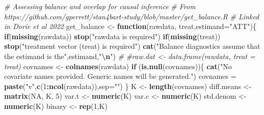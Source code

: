 \documentclass[
  12pt,
]{article}
\newenvironment{Shaded}{\begin{snugshade}}{\end{snugshade}}
\newcommand{\AttributeTok}[1]{\textcolor[rgb]{0.13,0.29,0.53}{#1}}
\newcommand{\CommentTok}[1]{\textcolor[rgb]{0.56,0.35,0.01}{\textit{#1}}}
\newcommand{\ConstantTok}[1]{\textcolor[rgb]{0.56,0.35,0.01}{#1}}
\newcommand{\ControlFlowTok}[1]{\textcolor[rgb]{0.13,0.29,0.53}{\textbf{#1}}}
\newcommand{\DecValTok}[1]{\textcolor[rgb]{0.00,0.00,0.81}{#1}}
\newcommand{\FunctionTok}[1]{\textcolor[rgb]{0.13,0.29,0.53}{\textbf{#1}}}
\newcommand{\NormalTok}[1]{#1}
\newcommand{\OtherTok}[1]{\textcolor[rgb]{0.56,0.35,0.01}{#1}}
\newcommand{\SpecialCharTok}[1]{\textcolor[rgb]{0.81,0.36,0.00}{\textbf{#1}}}
\newcommand{\StringTok}[1]{\textcolor[rgb]{0.31,0.60,0.02}{#1}}
\begin{document}
\begin{Shaded}
\begin{Highlighting}[]
\CommentTok{\# Assessing balance and overlap for causal inference}
\CommentTok{\# From https://github.com/gperrett/stan4bart{-}study/blob/master/get\_balance.R}
\CommentTok{\# Linked in Dorie et al 2022}
\NormalTok{get\_balance }\OtherTok{\textless{}{-}} \ControlFlowTok{function}\NormalTok{(rawdata, treat,}\AttributeTok{estimand=}\StringTok{"ATT"}\NormalTok{)\{}
  \ControlFlowTok{if}\NormalTok{(}\FunctionTok{missing}\NormalTok{(rawdata)) }\FunctionTok{stop}\NormalTok{(}\StringTok{"rawdata is required"}\NormalTok{)}
  \ControlFlowTok{if}\NormalTok{(}\FunctionTok{missing}\NormalTok{(treat)) }\FunctionTok{stop}\NormalTok{(}\StringTok{"treatment vector (treat) is required"}\NormalTok{)}
  \FunctionTok{cat}\NormalTok{(}\StringTok{"Balance diagnostics assume that the estimand is the"}\NormalTok{,estimand,}\StringTok{"}\SpecialCharTok{\textbackslash{}n}\StringTok{"}\NormalTok{)}
  \CommentTok{\#}
  \CommentTok{\#raw.dat \textless{}{-} data.frame(rawdata, treat = treat)}
\NormalTok{  covnames }\OtherTok{\textless{}{-}} \FunctionTok{colnames}\NormalTok{(rawdata)}
  \ControlFlowTok{if}\NormalTok{ (}\FunctionTok{is.null}\NormalTok{(covnames))\{}
    \FunctionTok{cat}\NormalTok{(}\StringTok{"No covariate names provided.  Generic names will be generated."}\NormalTok{)}
\NormalTok{    covnames }\OtherTok{=} \FunctionTok{paste}\NormalTok{(}\StringTok{"v"}\NormalTok{,}\FunctionTok{c}\NormalTok{(}\DecValTok{1}\SpecialCharTok{:}\FunctionTok{ncol}\NormalTok{(rawdata)),}\AttributeTok{sep=}\StringTok{""}\NormalTok{)}
\NormalTok{  \}}
\NormalTok{  K }\OtherTok{\textless{}{-}} \FunctionTok{length}\NormalTok{(covnames)}
\NormalTok{  diff.means }\OtherTok{\textless{}{-}} \FunctionTok{matrix}\NormalTok{(}\ConstantTok{NA}\NormalTok{, K, }\DecValTok{5}\NormalTok{)}
\NormalTok{  var.t }\OtherTok{\textless{}{-}} \FunctionTok{numeric}\NormalTok{(K)}
\NormalTok{  var.c }\OtherTok{\textless{}{-}} \FunctionTok{numeric}\NormalTok{(K)}
\NormalTok{  std.denom }\OtherTok{\textless{}{-}} \FunctionTok{numeric}\NormalTok{(K)}
\NormalTok{  binary }\OtherTok{\textless{}{-}} \FunctionTok{rep}\NormalTok{(}\DecValTok{1}\NormalTok{,K)}
  

\end{Highlighting}
\end{Shaded}
\end{document}
